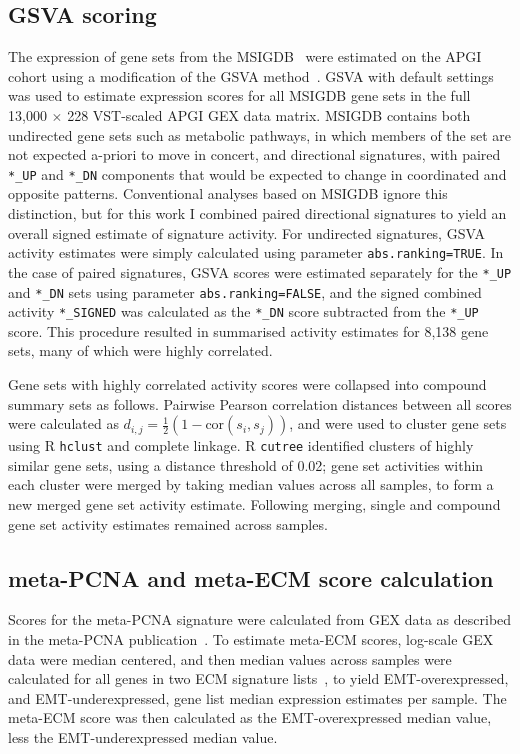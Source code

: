 \documentclass[dissertation.tex]{subfiles}
\begin{document}
\subsection{\texorpdfstring{\acrshort{GSVA}}{GSVA} scoring}
The expression of gene sets from the \gls{MSIGDB}~\cite{Subramanian2005} were estimated on the \gls{APGI} cohort using a modification of the \gls{GSVA} method~\cite{Hanzelmann2013}.  \gls{GSVA} with default settings was used to estimate expression scores for all \gls{MSIGDB} gene sets in the full 13,000 $\times$ 228 \gls{VST}-scaled \gls{APGI} \gls{GEX} data matrix.  \gls{MSIGDB} contains both undirected gene sets such as metabolic pathways, in which members of the set are not expected a-priori to move in concert, and directional signatures, with paired \texttt{*\_UP} and \texttt{*\_DN} components that would be expected to change in coordinated and opposite patterns.  Conventional analyses based on \gls{MSIGDB} ignore this distinction, but for this work I combined paired directional signatures to yield an overall signed estimate of signature activity.  For undirected signatures, \gls{GSVA} activity estimates were simply calculated using parameter \texttt{abs.ranking=TRUE}.  In the case of paired signatures, \gls{GSVA} scores were estimated separately for the \texttt{*\_UP} and \texttt{*\_DN} sets using parameter \texttt{abs.ranking=FALSE}, and the signed combined activity \texttt{*\_SIGNED} was calculated as the \texttt{*\_DN} score subtracted from the \texttt{*\_UP} score.  This procedure resulted in summarised activity estimates for 8,138 gene sets, many of which were highly correlated.

Gene sets with highly correlated activity scores were collapsed into compound summary sets as follows.  Pairwise Pearson correlation distances between all scores were calculated as $d_{i,j} = \frac{1}{2}(1 - \text{cor}(s_i, s_j))$, and were used to cluster gene sets using R \texttt{hclust} and complete linkage.  R \texttt{cutree} identified clusters of highly similar gene sets, using a distance threshold of 0.02; gene set activities within each cluster were merged by taking median values across all samples, to form a new merged gene set activity estimate.  Following merging,  single and compound gene set activity estimates remained across  samples.

\subsection{meta-PCNA and meta-ECM score calculation}
Scores for the meta-PCNA signature were calculated from \gls{GEX} data as described in the meta-PCNA publication~\cite{Venet2011}.  To estimate meta-ECM scores, log-scale \gls{GEX} data were median centered, and then median values across samples were calculated for all genes in two ECM signature lists~\cite[Table~S3]{Groger2012}, to yield EMT-overexpressed, and EMT-underexpressed, gene list median expression estimates per sample.  The meta-ECM score was then calculated as the EMT-overexpressed median value, less the EMT-underexpressed median value.
\end{document}
